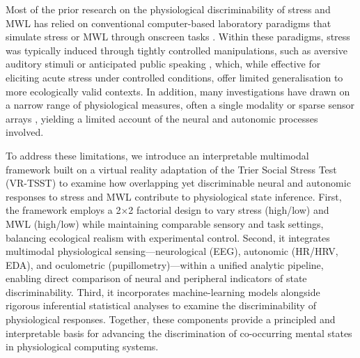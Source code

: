 \documentclass[lettersize,journal]{IEEEtran}
\begin{document}
Most of the prior research on the physiological discriminability of stress and MWL has relied on conventional computer-based laboratory paradigms that simulate stress or MWL through onscreen tasks \cite{setzDiscriminatingStressCognitive2010, parentDiagnosticityPsychophysiologicalSignatures2019, muhlEEGbasedWorkloadEstimation2014, bagheriEEGbasedDetectionMental2020, bagheriSimultaneousClassificationBoth2022, ehrhardtSeparatingEEGCorrelates2022, vanhollebekeEffectsAcutePsychosocial2023, peiIdentifyingNeurophysiologicalCorrelates2024}. Within these paradigms, stress was typically induced through tightly controlled manipulations, such as aversive auditory stimuli \cite{parentDiagnosticityPsychophysiologicalSignatures2019} or anticipated public speaking \cite{bagheriEEGbasedDetectionMental2020, bagheriSimultaneousClassificationBoth2022}, which, while effective for eliciting acute stress under controlled conditions, offer limited generalisation to more ecologically valid contexts. In addition, many investigations have drawn on a narrow range of physiological measures, often a single modality \cite{setzDiscriminatingStressCognitive2010, ehrhardtSeparatingEEGCorrelates2022, bagheriEEGbasedDetectionMental2020, bagheriSimultaneousClassificationBoth2022,gioiaDiscriminatingStressCognitive2021} or sparse sensor arrays \cite{ehrhardtSeparatingEEGCorrelates2022, parentDiagnosticityPsychophysiologicalSignatures2019}, yielding a limited account of the neural and autonomic processes involved.

To address these limitations, we introduce an interpretable multimodal framework built on a virtual reality adaptation of the Trier Social Stress Test (VR-TSST) to examine how overlapping yet discriminable neural and autonomic responses to stress and MWL contribute to physiological state inference. 
First, the framework employs a 2×2 factorial design to vary stress (high/low) and MWL (high/low) while maintaining comparable sensory and task settings, balancing ecological realism with experimental control.
Second, it integrates multimodal physiological sensing—neurological (EEG), autonomic (HR/HRV, EDA), and oculometric (pupillometry)—within a unified analytic pipeline, enabling direct comparison of neural and peripheral indicators of state discriminability.
Third, it incorporates machine-learning models alongside rigorous inferential statistical analyses to examine the discriminability of physiological responses.
Together, these components provide a principled and interpretable basis for advancing the discrimination of co-occurring mental states in physiological computing systems.
\end{document}
